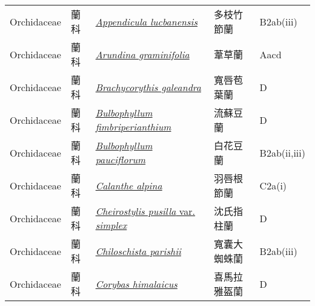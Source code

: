 {\begin{longtable}{p{2.5cm}p{2.5cm}p{4.5cm}p{2.5cm}p{3cm}}
    Orchidaceae & 蘭科 & \href{http://www.theplantlist.org/tpl1.1/search?q=Appendicula+lucbanensis}{\textit{Appendicula lucbanensis} } & 多枝竹節蘭 & B2ab(iii) \index{Appendicula@\textit{Appendicula}!lucbanensis@\textit{lucbanensis}}  \index{多枝竹節蘭} \\
    Orchidaceae & 蘭科 & \href{http://www.theplantlist.org/tpl1.1/search?q=Arundina+graminifolia}{\textit{Arundina graminifolia} } & 葦草蘭 & Aacd \index{Arundina@\textit{Arundina}!graminifolia@\textit{graminifolia}}  \index{葦草蘭} \\
    Orchidaceae & 蘭科 & \href{http://www.theplantlist.org/tpl1.1/search?q=Brachycorythis+galeandra}{\textit{Brachycorythis galeandra} } & 寬唇苞葉蘭 & D \index{Brachycorythis@\textit{Brachycorythis}!galeandra@\textit{galeandra}}  \index{寬唇苞葉蘭} \\
    Orchidaceae & 蘭科 & \href{http://www.theplantlist.org/tpl1.1/search?q=Bulbophyllum+fimbriperianthium}{\textit{Bulbophyllum fimbriperianthium} } & 流蘇豆蘭 & D \index{Bulbophyllum@\textit{Bulbophyllum}!fimbriperianthium@\textit{fimbriperianthium}}  \index{流蘇豆蘭} \\
    Orchidaceae & 蘭科 & \href{http://www.theplantlist.org/tpl1.1/search?q=Bulbophyllum+pauciflorum}{\textit{Bulbophyllum pauciflorum} } & 白花豆蘭 & B2ab(ii,iii) \index{Bulbophyllum@\textit{Bulbophyllum}!pauciflorum@\textit{pauciflorum}}  \index{白花豆蘭} \\
    Orchidaceae & 蘭科 & \href{http://www.theplantlist.org/tpl1.1/search?q=Calanthe+alpina}{\textit{Calanthe alpina} } & 羽唇根節蘭 & C2a(i) \index{Calanthe@\textit{Calanthe}!alpina@\textit{alpina}}  \index{羽唇根節蘭} \\
    Orchidaceae & 蘭科 & \href{http://www.theplantlist.org/tpl1.1/search?q=Cheirostylis+pusilla+var.+simplex}{\textit{Cheirostylis pusilla} var. \textit{simplex} } & 沈氏指柱蘭 & D \index{Cheirostylis@\textit{Cheirostylis}!pusilla@\textit{pusilla}!var. simplex@var. \textit{simplex}}  \index{沈氏指柱蘭} \\
    Orchidaceae & 蘭科 & \href{http://www.theplantlist.org/tpl1.1/search?q=Chiloschista+parishii}{\textit{Chiloschista parishii} } & 寬囊大蜘蛛蘭 & B2ab(iii) \index{Chiloschista@\textit{Chiloschista}!parishii@\textit{parishii}}  \index{寬囊大蜘蛛蘭} \\
    Orchidaceae & 蘭科 & \href{http://www.theplantlist.org/tpl1.1/search?q=Corybas+himalaicus}{\textit{Corybas himalaicus} } & 喜馬拉雅盔蘭 & D \index{Corybas@\textit{Corybas}!himalaicus@\textit{himalaicus}}  \index{喜馬拉雅盔蘭} \\

\end{longtable}}

